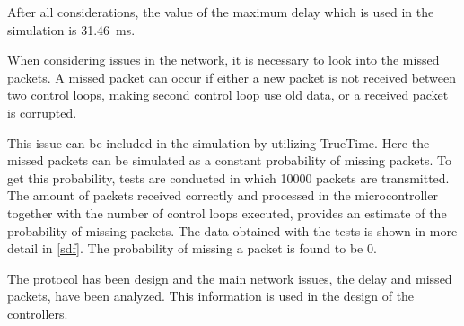 After all considerations, the value of the maximum delay which is used in the simulation is \SI{31.46}{ms}.

When considering issues in the network, it is necessary to look into the missed packets. A missed packet can occur if either a new packet is not received between two control loops, making second control loop use old data, or a received packet is corrupted.

This issue can be included in the simulation by utilizing TrueTime. Here the missed packets can be simulated as a constant probability of missing packets. To get this probability, tests are conducted in which 10000 packets are transmitted. The amount of packets received correctly and processed in the microcontroller together with the number of control loops executed, provides an estimate of the probability of missing packets. The data obtained with the tests is shown in more detail in \autoref{sdf}. The probability of missing a packet is found to be 0.

The protocol has been design and the main network issues, the delay and missed packets, have been analyzed. This information is used in the design of the controllers.


